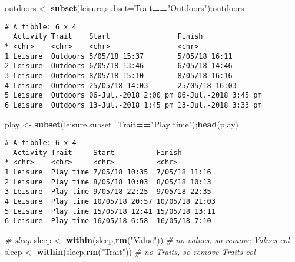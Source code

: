 \documentclass[10,portrait]{article}
\newenvironment{Shaded}{\begin{snugshade}}{\end{snugshade}}
\newcommand{\KeywordTok}[1]{\textcolor[rgb]{0.13,0.29,0.53}{\textbf{#1}}}
\newcommand{\DataTypeTok}[1]{\textcolor[rgb]{0.13,0.29,0.53}{#1}}
\newcommand{\StringTok}[1]{\textcolor[rgb]{0.31,0.60,0.02}{#1}}
\newcommand{\CommentTok}[1]{\textcolor[rgb]{0.56,0.35,0.01}{\textit{#1}}}
\newcommand{\OperatorTok}[1]{\textcolor[rgb]{0.81,0.36,0.00}{\textbf{#1}}}
\newcommand{\NormalTok}[1]{#1}
\begin{document}
\begin{Shaded}
\begin{Highlighting}[]
\NormalTok{outdoors <-}\StringTok{ }\KeywordTok{subset}\NormalTok{(leisure,}\DataTypeTok{subset=}\NormalTok{Trait}\OperatorTok{==}\StringTok{"Outdoors"}\NormalTok{);outdoors}
\end{Highlighting}
\end{Shaded}

\begin{verbatim}
# A tibble: 6 x 4
  Activity Trait    Start                Finish              
* <chr>    <chr>    <chr>                <chr>               
1 Leisure  Outdoors 5/05/18 15:37        5/05/18 16:11       
2 Leisure  Outdoors 6/05/18 13:46        6/05/18 14:46       
3 Leisure  Outdoors 8/05/18 15:10        8/05/18 16:16       
4 Leisure  Outdoors 25/05/18 14:03       25/05/18 16:03      
5 Leisure  Outdoors 06-Jul.-2018 2:00 pm 06-Jul.-2018 3:45 pm
6 Leisure  Outdoors 13-Jul.-2018 1:45 pm 13-Jul.-2018 3:33 pm
\end{verbatim}

\begin{Shaded}
\begin{Highlighting}[]
\NormalTok{play <-}\StringTok{ }\KeywordTok{subset}\NormalTok{(leisure,}\DataTypeTok{subset=}\NormalTok{Trait}\OperatorTok{==}\StringTok{"Play time"}\NormalTok{);}\KeywordTok{head}\NormalTok{(play)}
\end{Highlighting}
\end{Shaded}

\begin{verbatim}
# A tibble: 6 x 4
  Activity Trait     Start          Finish        
* <chr>    <chr>     <chr>          <chr>         
1 Leisure  Play time 7/05/18 10:35  7/05/18 11:16 
2 Leisure  Play time 8/05/18 10:03  8/05/18 10:13 
3 Leisure  Play time 9/05/18 22:25  9/05/18 22:35 
4 Leisure  Play time 10/05/18 20:57 10/05/18 21:03
5 Leisure  Play time 15/05/18 12:41 15/05/18 13:11
6 Leisure  Play time 16/05/18 6:58  16/05/18 7:10 
\end{verbatim}

\begin{Shaded}
\begin{Highlighting}[]
\CommentTok{# sleep}
\NormalTok{sleep <-}\StringTok{ }\KeywordTok{within}\NormalTok{(sleep,}\KeywordTok{rm}\NormalTok{(}\StringTok{"Value"}\NormalTok{)) }\CommentTok{# no values, so remove Values col}
\NormalTok{sleep <-}\StringTok{ }\KeywordTok{within}\NormalTok{(sleep,}\KeywordTok{rm}\NormalTok{(}\StringTok{"Trait"}\NormalTok{)) }\CommentTok{# no Traits, so remove Traits col}
\end{Highlighting}
\end{Shaded}
\end{document}
